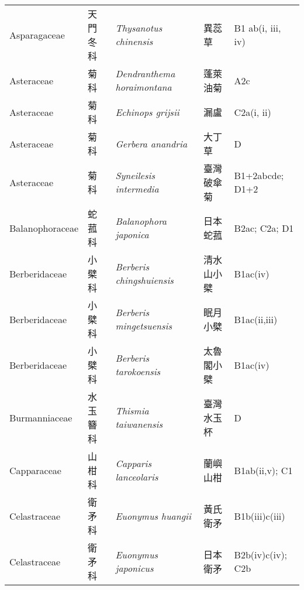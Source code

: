 {\begin{longtable}{p{2.5cm}p{2.5cm}p{4.5cm}p{2.5cm}p{3cm}}
    Asparagaceae & 天門冬科 & \textit{Thysanotus chinensis}  & 異蕊草 & B1 ab(i, iii, iv) \index{Thysanotus@\textit{Thysanotus}!chinensis@\textit{chinensis}}  \index{異蕊草} \\
    Asteraceae & 菊科 & \textit{Dendranthema horaimontana}  & 蓬萊油菊 & A2c \index{Dendranthema@\textit{Dendranthema}!horaimontana@\textit{horaimontana}}  \index{蓬萊油菊} \\
    Asteraceae & 菊科 & \textit{Echinops grijsii}  & 漏盧 & C2a(i, ii) \index{Echinops@\textit{Echinops}!grijsii@\textit{grijsii}}  \index{漏盧} \\
    Asteraceae & 菊科 & \textit{Gerbera anandria}  & 大丁草 & D \index{Gerbera@\textit{Gerbera}!anandria@\textit{anandria}}  \index{大丁草} \\
    Asteraceae & 菊科 & \textit{Syneilesis intermedia}  & 臺灣破傘菊 & B1+2abcde; D1+2 \index{Syneilesis@\textit{Syneilesis}!intermedia@\textit{intermedia}}  \index{臺灣破傘菊} \\
    Balanophoraceae & 蛇菰科 & \textit{Balanophora japonica}  & 日本蛇菰 & B2ac; C2a; D1 \index{Balanophora@\textit{Balanophora}!japonica@\textit{japonica}}  \index{日本蛇菰} \\
    Berberidaceae & 小檗科 & \textit{Berberis chingshuiensis}  & 清水山小檗 & B1ac(iv) \index{Berberis@\textit{Berberis}!chingshuiensis@\textit{chingshuiensis}}  \index{清水山小檗} \\
    Berberidaceae & 小檗科 & \textit{Berberis mingetsuensis}  & 眠月小檗 & B1ac(ii,iii) \index{Berberis@\textit{Berberis}!mingetsuensis@\textit{mingetsuensis}}  \index{眠月小檗} \\
    Berberidaceae & 小檗科 & \textit{Berberis tarokoensis}  & 太魯閣小檗 & B1ac(iv) \index{Berberis@\textit{Berberis}!tarokoensis@\textit{tarokoensis}}  \index{太魯閣小檗} \\
    Burmanniaceae & 水玉簪科 & \textit{Thismia taiwanensis}  & 臺灣水玉杯 & D \index{Thismia@\textit{Thismia}!taiwanensis@\textit{taiwanensis}}  \index{臺灣水玉杯} \\
    Capparaceae & 山柑科 & \textit{Capparis lanceolaris}  & 蘭嶼山柑 & B1ab(ii,v); C1 \index{Capparis@\textit{Capparis}!lanceolaris@\textit{lanceolaris}}  \index{蘭嶼山柑} \\
    Celastraceae & 衛矛科 & \textit{Euonymus huangii}  & 黃氏衛矛 & B1b(iii)c(iii) \index{Euonymus@\textit{Euonymus}!huangii@\textit{huangii}}  \index{黃氏衛矛} \\
    Celastraceae & 衛矛科 & \textit{Euonymus japonicus}  & 日本衛矛 & B2b(iv)c(iv); C2b \index{Euonymus@\textit{Euonymus}!japonicus@\textit{japonicus}}  \index{日本衛矛} \\

\end{longtable}}
